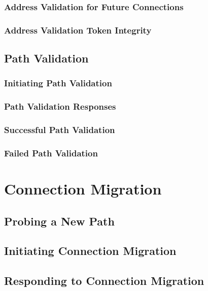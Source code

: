 \documentclass{article}
\begin{document}
\subsubsection{Address Validation for Future Connections}

\subsubsection{Address Validation Token Integrity}

\subsection{Path Validation}

\subsubsection{Initiating Path Validation}

\subsubsection{Path Validation Responses}

\subsubsection{Successful Path Validation}

\subsubsection{Failed Path Validation}

\section{Connection Migration}

\subsection{Probing a New Path}

\subsection{Initiating Connection Migration}

\subsection{Responding to Connection Migration}
\end{document}
